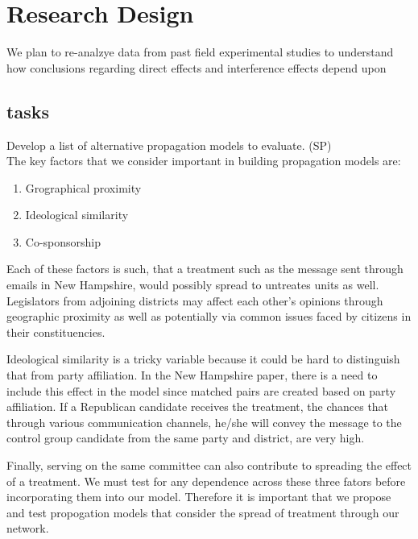 \documentclass[12pt]{article}
\begin{document}
\section{Research Design}

We plan to re-analzye data from past field experimental studies to understand how conclusions regarding direct effects and interference effects depend upon 

\subsection{tasks}

Develop a list of alternative propagation models to evaluate. (SP) \\

The key factors that we consider important in building propagation models are: \\

\begin{enumerate}

\item Grographical proximity
\item Ideological similarity
\item Co-sponsorship

\end{enumerate}

Each of these factors is such, that a treatment such as the message sent through emails in New Hampshire, would possibly spread to untreates units as well. Legislators from adjoining districts may affect each other's opinions through geographic proximity as well as potentially via common issues faced by citizens in their constituencies.

Ideological similarity is a tricky variable because it could be hard to distinguish that from party affiliation. In the New Hampshire paper, there is a need to include this effect in the model since matched pairs are created based on party affiliation. If a Republican candidate receives the treatment, the chances that through various communication channels, he/she will convey the message to the control group candidate from the same party and district, are very high.

Finally, serving on the same committee can also contribute to spreading the effect of a treatment. We must test for any dependence across these three fators before incorporating them into our model. Therefore it is important that we propose and test propogation models that consider the spread of treatment through our network.
\end{document}
